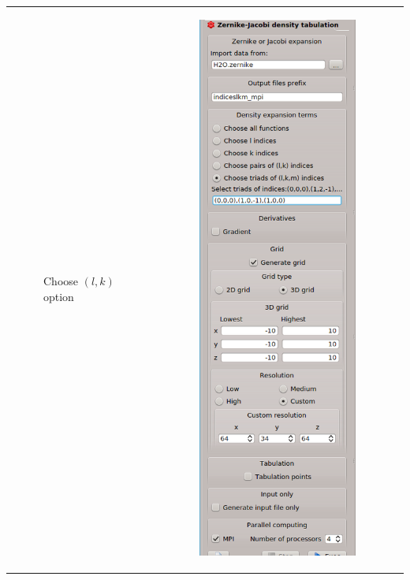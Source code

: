 \documentclass[10pt]{article}
\begin{document}
\begin{tabular}{lcr}
\begin{minipage}{.3\linewidth}
\begin{figure}[H]
\begin{center}
\end{center}
\caption{{Choose $(l,k)$ option}\label{fig:2_14_3}}
\end{figure}
\end{minipage}
&
\begin{minipage}{.3\linewidth}
\begin{figure}[H]
\begin{center}
\vspace*{3mm}
\includegraphics[width=.75\linewidth]{damqt_fig_2_14_4.png}

\end{center}
\end{figure}
\end{minipage}
\end{tabular}
\end{document}
